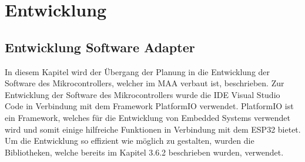 \documentclass[11pt, twoside]{article}
\begin{document}
\section{Entwicklung}
\subsection{Entwicklung Software Adapter}
In diesem Kapitel wird der Übergang der Planung in die Entwicklung der Software des Mikrocontrollers, welcher im MAA verbaut ist, beschrieben. 
Zur Entwicklung der Software des Mikrocontrollers wurde die IDE Visual Studio Code in Verbindung mit dem Framework PlatformIO verwendet. PlatformIO ist ein Framework, welches für die Entwicklung von Embedded Systems verwendet wird und somit einige hilfreiche Funktionen in Verbindung mit dem ESP32 bietet. \parencite[vgl.][]{noauthor_urlpi26_nodate} Um die Entwicklung so effizient wie möglich zu gestalten, wurden die Bibliotheken, welche bereits im Kapitel 3.6.2 beschrieben wurden, verwendet.
\end{document}
